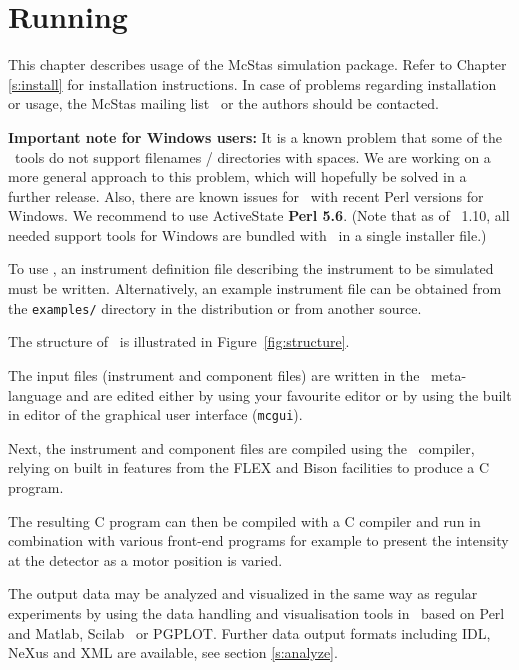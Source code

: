 
\chapter{Running \MCS}
\label{c:running}
This chapter describes usage of the McStas simulation package. Refer
to Chapter \ref{s:install} for installation instructions. In case of
problems regarding installation or usage, the McStas mailing
list~\cite{mcstas_webpage} or the authors should be contacted.

{\bf Important note for Windows users:} It is a known problem that some of
the \MCS\ tools do not support filenames / directories with spaces.
We are working on a more general approach to this problem, which will
hopefully be solved in a further release. Also, there are known issues
for \MCS\ with recent Perl versions for Windows. We recommend to use
ActiveState {\bf Perl 5.6}. (Note that as of \MCS\ 1.10, all needed
support tools for Windows are bundled with \MCS\ in a single installer file.)

To use \MCS, an instrument
definition file describing the instrument to be simulated must be
written. Alternatively, an example instrument file can be obtained
from the \verb+examples/+ directory in the distribution or from
another source.

The structure of \MCS\ is illustrated in Figure~\ref{fig:structure}.

The input files (instrument and component files) are written in the \MCS\
meta-language and are edited either by using your favourite editor
or by using the built in editor of the graphical user interface
(\texttt{mcgui}).

Next, the instrument and component files are compiled using the \MCS\
compiler, relying on built in features from the FLEX and Bison facilities to produce a C program.

The resulting C program can then be
compiled with a C compiler and run in combination with various
front-end programs for example to present the intensity at the
detector as a motor position is varied.

The output data may be analyzed and visualized in the same way as
regular experiments by using the data handling and visualisation tools in \MCS\ based on
Perl and Matlab, Scilab~\cite{scilab_webpage} or PGPLOT. Further data
output formats including IDL, NeXus and XML are available, see section \ref{s:analyze}.

